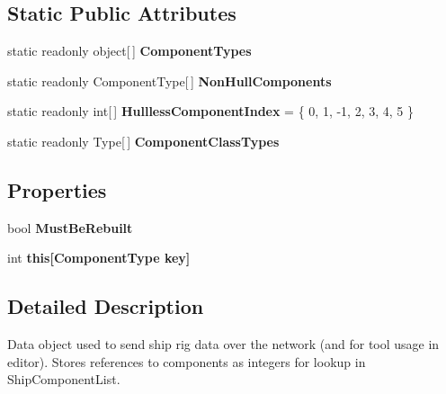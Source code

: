 \subsection*{Static Public Attributes}
\begin{DoxyCompactItemize}
\item 
static readonly object\mbox{[}$\,$\mbox{]} {\bfseries Component\-Types}
\item 
static readonly Component\-Type\mbox{[}$\,$\mbox{]} {\bfseries Non\-Hull\-Components}
\item 
\hypertarget{class_ship_data_a86aa2a6240f6c742448db2ce4cf7defe}{static readonly int\mbox{[}$\,$\mbox{]} {\bfseries Hullless\-Component\-Index} = \{ 0, 1, -\/1, 2, 3, 4, 5 \}}\label{class_ship_data_a86aa2a6240f6c742448db2ce4cf7defe}

\item 
static readonly Type\mbox{[}$\,$\mbox{]} {\bfseries Component\-Class\-Types}
\end{DoxyCompactItemize}
\subsection*{Properties}
\begin{DoxyCompactItemize}
\item 
\hypertarget{class_ship_data_aac11d1d3a4544a1179546eb8c8bb9988}{bool {\bfseries Must\-Be\-Rebuilt}}\label{class_ship_data_aac11d1d3a4544a1179546eb8c8bb9988}

\item 
\hypertarget{class_ship_data_aca9ad1e98ef2ae074cd214d869a64de7}{int {\bfseries this\mbox{[}\-Component\-Type key\mbox{]}}}\label{class_ship_data_aca9ad1e98ef2ae074cd214d869a64de7}

\end{DoxyCompactItemize}


\subsection{Detailed Description}
Data object used to send ship rig data over the network (and for tool usage in editor). Stores references to components as integers for lookup in Ship\-Component\-List. 



